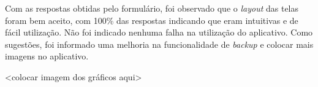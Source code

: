 Com as respostas obtidas pelo formulário, foi observado que o \textit{layout} das telas foram bem aceito, com 100\% das respostas indicando que eram intuitivas e de fácil utilização. Não foi indicado nenhuma falha na utilização do aplicativo. Como sugestões, foi informado uma melhoria na funcionalidade de \textit{backup} e colocar mais imagens no aplicativo.

<colocar imagem dos gráficos aqui>